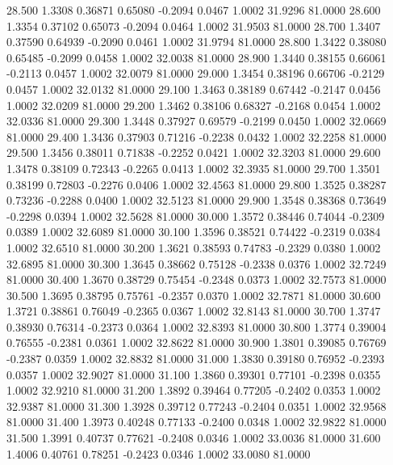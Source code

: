   28.500   1.3308   0.36871   0.65080  -0.2094   0.0467   1.0002  31.9296  81.0000
  28.600   1.3354   0.37102   0.65073  -0.2094   0.0464   1.0002  31.9503  81.0000
  28.700   1.3407   0.37590   0.64939  -0.2090   0.0461   1.0002  31.9794  81.0000
  28.800   1.3422   0.38080   0.65485  -0.2099   0.0458   1.0002  32.0038  81.0000
  28.900   1.3440   0.38155   0.66061  -0.2113   0.0457   1.0002  32.0079  81.0000
  29.000   1.3454   0.38196   0.66706  -0.2129   0.0457   1.0002  32.0132  81.0000
  29.100   1.3463   0.38189   0.67442  -0.2147   0.0456   1.0002  32.0209  81.0000
  29.200   1.3462   0.38106   0.68327  -0.2168   0.0454   1.0002  32.0336  81.0000
  29.300   1.3448   0.37927   0.69579  -0.2199   0.0450   1.0002  32.0669  81.0000
  29.400   1.3436   0.37903   0.71216  -0.2238   0.0432   1.0002  32.2258  81.0000
  29.500   1.3456   0.38011   0.71838  -0.2252   0.0421   1.0002  32.3203  81.0000
  29.600   1.3478   0.38109   0.72343  -0.2265   0.0413   1.0002  32.3935  81.0000
  29.700   1.3501   0.38199   0.72803  -0.2276   0.0406   1.0002  32.4563  81.0000
  29.800   1.3525   0.38287   0.73236  -0.2288   0.0400   1.0002  32.5123  81.0000
  29.900   1.3548   0.38368   0.73649  -0.2298   0.0394   1.0002  32.5628  81.0000
  30.000   1.3572   0.38446   0.74044  -0.2309   0.0389   1.0002  32.6089  81.0000
  30.100   1.3596   0.38521   0.74422  -0.2319   0.0384   1.0002  32.6510  81.0000
  30.200   1.3621   0.38593   0.74783  -0.2329   0.0380   1.0002  32.6895  81.0000
  30.300   1.3645   0.38662   0.75128  -0.2338   0.0376   1.0002  32.7249  81.0000
  30.400   1.3670   0.38729   0.75454  -0.2348   0.0373   1.0002  32.7573  81.0000
  30.500   1.3695   0.38795   0.75761  -0.2357   0.0370   1.0002  32.7871  81.0000
  30.600   1.3721   0.38861   0.76049  -0.2365   0.0367   1.0002  32.8143  81.0000
  30.700   1.3747   0.38930   0.76314  -0.2373   0.0364   1.0002  32.8393  81.0000
  30.800   1.3774   0.39004   0.76555  -0.2381   0.0361   1.0002  32.8622  81.0000
  30.900   1.3801   0.39085   0.76769  -0.2387   0.0359   1.0002  32.8832  81.0000
  31.000   1.3830   0.39180   0.76952  -0.2393   0.0357   1.0002  32.9027  81.0000
  31.100   1.3860   0.39301   0.77101  -0.2398   0.0355   1.0002  32.9210  81.0000
  31.200   1.3892   0.39464   0.77205  -0.2402   0.0353   1.0002  32.9387  81.0000
  31.300   1.3928   0.39712   0.77243  -0.2404   0.0351   1.0002  32.9568  81.0000
  31.400   1.3973   0.40248   0.77133  -0.2400   0.0348   1.0002  32.9822  81.0000
  31.500   1.3991   0.40737   0.77621  -0.2408   0.0346   1.0002  33.0036  81.0000
  31.600   1.4006   0.40761   0.78251  -0.2423   0.0346   1.0002  33.0080  81.0000
